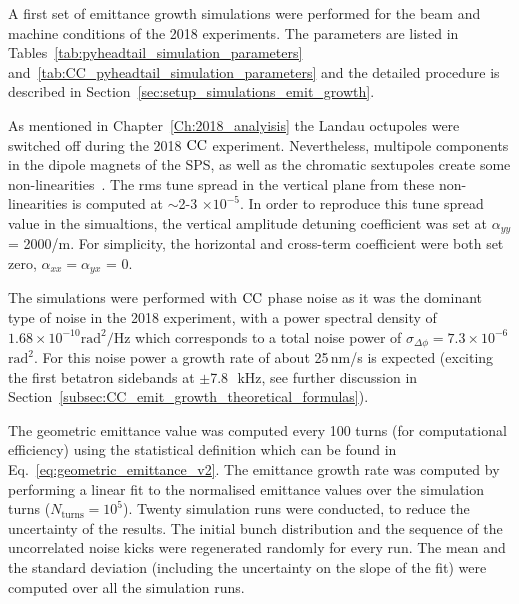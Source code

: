 A first set of emittance growth simulations were performed for the beam and machine conditions of the 2018 experiments. The parameters are listed in Tables~\ref{tab:pyheadtail_simulation_parameters} and~\ref{tab:CC_pyheadtail_simulation_parameters} and the detailed procedure is described in Section~\ref{sec:setup_simulations_emit_growth}. %

As mentioned in Chapter~\ref{Ch:2018_analyisis} the Landau octupoles were switched off during the 2018 ${\mathrm{CC}}$ experiment. Nevertheless, multipole components in the dipole magnets of the SPS, as well as the chromatic sextupoles create some non-linearities~\cite{Carlà:2664976, Alekou:2640326}. The rms tune spread in the vertical plane from these non-linearities is computed at $\sim$2-3 $\times 10^{-5}$. In order to reproduce this tune spread value in the simualtions, the vertical amplitude detuning coefficient was set at $\alpha_{yy}$ = 2000/m. For simplicity, the horizontal and cross-term coefficient were both set zero, $\alpha_{xx}=\alpha_{yx}$ = 0.

The simulations were performed with ${\mathrm{CC}}$ phase noise as it was the dominant type of noise in the 2018 experiment, with a power spectral density of $1.68 \times 10^{-10} \mathrm{rad^2/Hz}$ which corresponds to a total noise power of $\sigma_{\Delta \phi}=7.3\times 10^{-6}$\,$\mathrm{rad^2}$. For this noise power a growth rate of about 25\,nm/s is expected (exciting the first betatron sidebands at $\pm$7.8~\,kHz, see further discussion in Section~\ref{subsec:CC_emit_growth_theoretical_formulas}). 

The geometric emittance value was computed every 100 turns (for computational efficiency) using the statistical definition which can be found in Eq.~\eqref{eq:geometric_emittance_v2}. The emittance growth rate was computed by performing a linear fit to the normalised 
emittance values over the simulation turns ($N_\mathrm{turns}=10^5$). Twenty simulation runs were conducted, to reduce the uncertainty of the results. The initial bunch distribution and the sequence of the uncorrelated noise kicks were regenerated randomly for every run. The mean and the standard deviation (including the uncertainty on the slope of the fit) were computed over all the simulation runs.  

